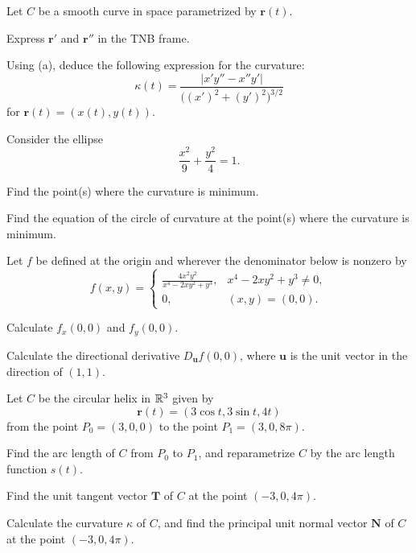 \begin{problem}
Let $C$ be a smooth curve in space parametrized by $\mathbf r(t)$.
\begin{problemsubparts}
\item Express $\mathbf r'$ and $\mathbf r''$ in the TNB frame.
\item Using (a), deduce the following expression for the curvature:
\[
\kappa(t)=
\frac{|x'y''-x''y'|}{\bigl((x')^2+(y')^2\bigr)^{3/2}}
\]
for $\mathbf r(t)=(x(t), y(t))$.
\end{problemsubparts}
\end{problem}

\begin{problem}
Consider the ellipse
\[
\frac{x^2}{9}+\frac{y^2}{4}=1.
\]
\begin{problemsubparts}
\item Find the point(s) where the curvature is minimum.
\item Find the equation of the circle of curvature at the point(s) where the curvature is minimum.
\end{problemsubparts}
\end{problem}

\begin{problem}
Let $f$ be defined at the origin and wherever the denominator below is nonzero by
\[
f(x, y)=
\begin{cases}
\displaystyle\frac{4x^2y^2}{x^4-2xy^2+y^3}, & x^4-2xy^2+y^3\ne0, \\[0.6em]
0, & (x, y)=(0, 0).
\end{cases}
\]
\begin{problemsubparts}
\item Calculate $f_x(0, 0)$ and $f_y(0, 0)$.
\item Calculate the directional derivative $D_{\mathbf u}f(0, 0)$, where $\mathbf u$ is the unit vector in the direction of $(1, 1)$.
\end{problemsubparts}
\end{problem}

\begin{problem}
Let $C$ be the circular helix in $\mathbb{R}^3$ given by
\[
\mathbf r(t)=(3\cos t, 3\sin t, 4t)
\]
from the point $P_0=(3, 0, 0)$ to the point $P_1=(3, 0, 8\pi)$.
\begin{problemsubparts}
\item Find the arc length of $C$ from $P_0$ to $P_1$, and reparametrize $C$ by the arc length function $s(t)$.
\item Find the unit tangent vector $\mathbf T$ of $C$ at the point $(-3, 0, 4\pi)$.
\item Calculate the curvature $\kappa$ of $C$, and find the principal unit normal vector $\mathbf N$ of $C$ at the point $(-3, 0, 4\pi)$.
\end{problemsubparts}
\end{problem}

